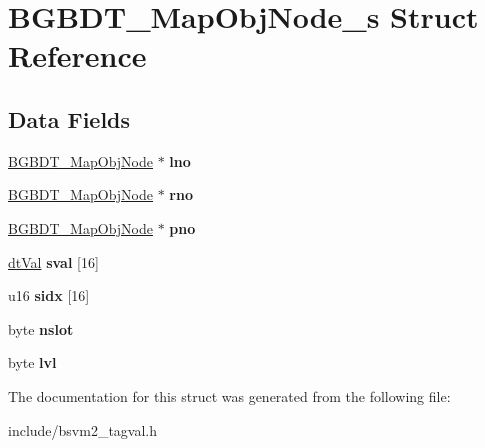 \hypertarget{structBGBDT__MapObjNode__s}{\section{B\-G\-B\-D\-T\-\_\-\-Map\-Obj\-Node\-\_\-s Struct Reference}
\label{structBGBDT__MapObjNode__s}
}
\subsection*{Data Fields}
\begin{DoxyCompactItemize}
\item 
\hypertarget{structBGBDT__MapObjNode__s_ae228d3b4362e76ad5502277ca8aadb01}{\hyperlink{structBGBDT__MapObjNode__s}{B\-G\-B\-D\-T\-\_\-\-Map\-Obj\-Node} $\ast$ {\bfseries lno}}\label{structBGBDT__MapObjNode__s_ae228d3b4362e76ad5502277ca8aadb01}

\item 
\hypertarget{structBGBDT__MapObjNode__s_aef50207ae9f56953c522b544f3ff5949}{\hyperlink{structBGBDT__MapObjNode__s}{B\-G\-B\-D\-T\-\_\-\-Map\-Obj\-Node} $\ast$ {\bfseries rno}}\label{structBGBDT__MapObjNode__s_aef50207ae9f56953c522b544f3ff5949}

\item 
\hypertarget{structBGBDT__MapObjNode__s_a975620910038a49f33afeee54c8d14a1}{\hyperlink{structBGBDT__MapObjNode__s}{B\-G\-B\-D\-T\-\_\-\-Map\-Obj\-Node} $\ast$ {\bfseries pno}}\label{structBGBDT__MapObjNode__s_a975620910038a49f33afeee54c8d14a1}

\item 
\hypertarget{structBGBDT__MapObjNode__s_a5dc0e8cad991c9361f8557eae5eab86a}{\hyperlink{unionBGBDT__TagValue__s}{dt\-Val} {\bfseries sval} \mbox{[}16\mbox{]}}\label{structBGBDT__MapObjNode__s_a5dc0e8cad991c9361f8557eae5eab86a}

\item 
\hypertarget{structBGBDT__MapObjNode__s_a757fd1465a9a5cc1a744636386936712}{u16 {\bfseries sidx} \mbox{[}16\mbox{]}}\label{structBGBDT__MapObjNode__s_a757fd1465a9a5cc1a744636386936712}

\item 
\hypertarget{structBGBDT__MapObjNode__s_a3099adf418cea8c46602e78dcfc8287b}{byte {\bfseries nslot}}\label{structBGBDT__MapObjNode__s_a3099adf418cea8c46602e78dcfc8287b}

\item 
\hypertarget{structBGBDT__MapObjNode__s_a02db9b8e87c26524641e51d0de678899}{byte {\bfseries lvl}}\label{structBGBDT__MapObjNode__s_a02db9b8e87c26524641e51d0de678899}

\end{DoxyCompactItemize}


The documentation for this struct was generated from the following file\-:\begin{DoxyCompactItemize}
\item 
include/bsvm2\-\_\-tagval.\-h\end{DoxyCompactItemize}
